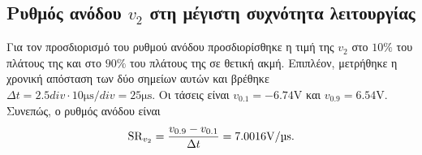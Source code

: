\subsection{Ρυθμός ανόδου $v_2$ στη μέγιστη συχνότητα λειτουργίας}
	Για τον προσδιορισμό του ρυθμού ανόδου προσδιορίσθηκε η τιμή της $v_2$ στο $10\%$ του πλάτους της και στο $90\%$ του πλάτους της σε θετική ακμή. Επιπλέον, μετρήθηκε η χρονική απόσταση των δύο σημείων αυτών και βρέθηκε $\Delta t=2.5\unit{div}\cdot10\unit{\micro\second\per div}=25\unit{\micro\second}$. Οι τάσεις είναι $v_{0.1}=-6.74\unit{\volt}$ και $v_{0.9}=6.54\unit{\volt}$. Συνεπώς, ο ρυθμός ανόδου είναι
	\begin{equation*}
		\mathrm{SR}_{v_2}=\frac{v_{0.9}-v_{0.1}}{\Delta t}=7.0016\unit{\volt\per{\micro\second}}.
	\end{equation*}